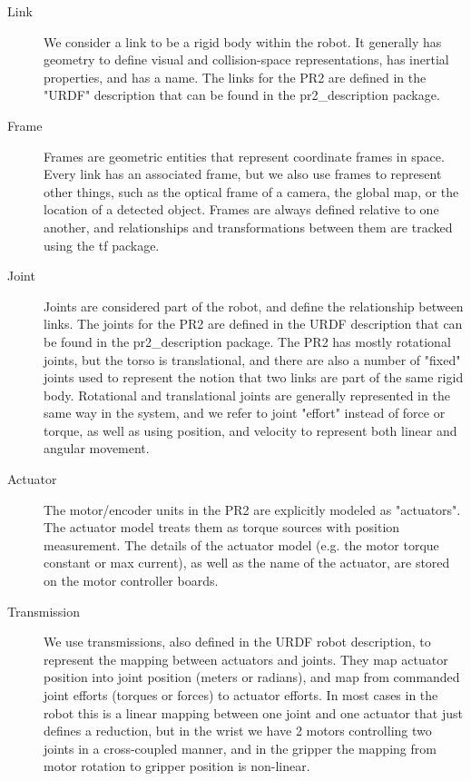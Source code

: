 \begin{description}
\item[Link] We consider a link to be a rigid body within the robot.  It
  generally has geometry to define visual and collision-space representations,
  has inertial properties, and has a name.  The links for the PR2 are defined in
  the "URDF" description that can be found in the pr2\_description package.
\item[Frame] Frames are geometric entities that represent coordinate frames in
  space.  Every link has an associated frame, but we also use frames to
  represent other things, such as the optical frame of a camera, the global map,
  or the location of a detected object.  Frames are always defined relative to
  one another, and relationships and transformations between them are tracked
  using the tf package.
\item[Joint] Joints are considered part of the robot, and define the
  relationship between links.  The joints for the PR2 are defined in the URDF
  description that can be found in the pr2\_description package.  The PR2 has
  mostly rotational joints, but the torso is translational, and there are also a
  number of "fixed" joints used to represent the notion that two links are part
  of the same rigid body.  Rotational and translational joints are generally
  represented in the same way in the system, and we refer to joint "effort"
  instead of force or torque, as well as using position, and velocity to
  represent both linear and angular movement.
\item[Actuator] The motor/encoder units in the PR2 are explicitly modeled as
  "actuators".  The actuator model treats them as torque sources with position
  measurement.  The details of the actuator model (e.g. the motor torque
  constant or max current), as well as the name of the actuator, are stored on
  the motor controller boards.
\item[Transmission] We use transmissions, also defined in the URDF robot
  description, to represent the mapping between actuators and joints.  They map
  actuator position into joint position (meters or radians), and map from
  commanded joint efforts (torques or forces) to actuator efforts.  In most
  cases in the robot this is a linear mapping between one joint and one actuator
  that just defines a reduction, but in the wrist we have 2 motors controlling
  two joints in a cross-coupled manner, and in the gripper the mapping from
  motor rotation to gripper position is non-linear.
\end{description}

